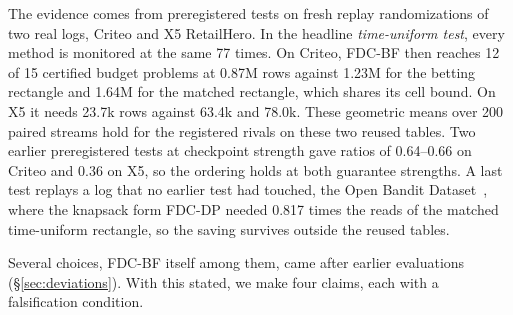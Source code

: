 \documentclass[sigconf,anonymous,review]{acmart}
\begin{document}
The evidence comes from preregistered tests on fresh replay randomizations of two real logs, Criteo and X5 RetailHero. In the headline \emph{time-uniform test}, every method is monitored at the same 77 times. On Criteo, FDC-BF then reaches 12 of 15 certified budget problems at 0.87M rows against 1.23M for the betting rectangle and 1.64M for the matched rectangle, which shares its cell bound. On X5 it needs 23.7k rows against 63.4k and 78.0k. These geometric means over 200 paired streams hold for the registered rivals on these two reused tables. Two earlier preregistered tests at checkpoint strength gave ratios of 0.64--0.66 on Criteo and 0.36 on X5, so the ordering holds at both guarantee strengths. A last test replays a log that no earlier test had touched, the Open Bandit Dataset~\citep{saito2021open}, where the knapsack form FDC-DP needed 0.817 times the reads of the matched time-uniform rectangle, so the saving survives outside the reused tables.

Several choices, FDC-BF itself among them, came after earlier evaluations (\S\ref{sec:deviations}). With this stated, we make four claims, each with a falsification condition.
\end{document}
